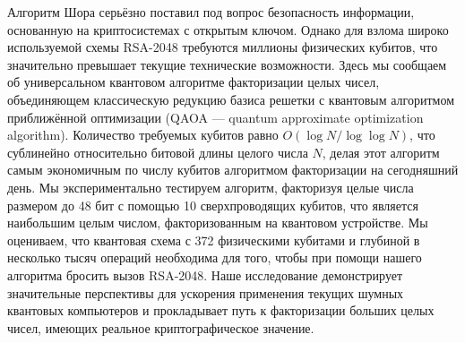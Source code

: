 
Алгоритм Шора серьёзно поставил под вопрос безопасность информации, основанную
на криптосистемах с открытым ключом. Однако для взлома широко используемой
схемы RSA-2048 требуются миллионы физических кубитов, что значительно превышает
текущие технические возможности. Здесь мы сообщаем об универсальном квантовом
алгоритме факторизации целых чисел, объединяющем классическую редукцию базиса
решетки с квантовым алгоритмом приближённой оптимизации (QAOA --- quantum
approximate optimization algorithm). Количество требуемых кубитов равно $O(\log
N / \log\log N)$, что сублинейно относительно битовой длины целого числа $N$,
делая этот алгоритм самым экономичным по числу кубитов алгоритмом факторизации
на сегодняшний день. Мы экспериментально тестируем алгоритм, факторизуя целые
числа размером до 48 бит с помощью 10 сверхпроводящих кубитов, что является
наибольшим целым числом, факторизованным на квантовом устройстве. Мы оцениваем,
что квантовая схема с 372 физическими кубитами и глубиной в несколько тысяч
операций необходима для того, чтобы при помощи нашего алгоритма бросить вызов
RSA-2048. Наше исследование демонстрирует значительные перспективы для
ускорения применения текущих шумных квантовых компьютеров и прокладывает путь к
факторизации больших целых чисел, имеющих реальное криптографическое значение.
